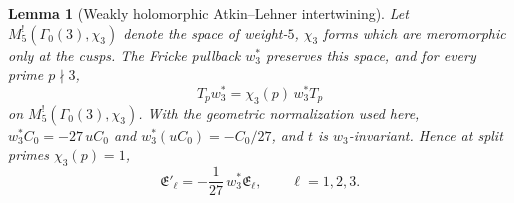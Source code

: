 \documentclass[11pt]{amsart}
\newtheorem{lemma}[theorem]{Lemma}
\theoremstyle{definition}
\theoremstyle{remark}
\begin{document}
\begin{lemma}[Weakly holomorphic Atkin--Lehner intertwining]\label{lem:atkin-lehner-intertwining}
Let $M_5^!(\Gamma_0(3),\chi_3)$ denote the space of weight-$5$, $\chi_3$ forms which are meromorphic only at the cusps. The Fricke pullback $w_3^*$ preserves this space, and for every prime $p\nmid 3$,
\[
T_p w_3^*=\chi_3(p)\,w_3^*T_p
\]
on $M_5^!(\Gamma_0(3),\chi_3)$. With the geometric normalization used here, $w_3^*C_0=-27\,uC_0$ and $w_3^*(uC_0)=-C_0/27$, and $t$ is $w_3$-invariant. Hence at split primes $\chi_3(p)=1$,
\begin{equation}\label{eq:fricke-intertwining}
\mathfrak E'_\ell=-\frac{1}{27}\,w_3^*\mathfrak E_\ell,\qquad\ell=1,2,3.
\end{equation}
\end{lemma}
\end{document}
